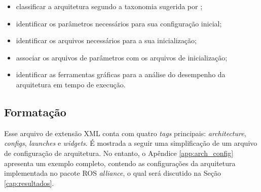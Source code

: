         \begin{itemize}
            \item classificar a arquitetura segundo a taxonomia sugerida por ;
            
            \item identificar os parâmetros necessários para sua configuração inicial;
            
            \item identificar os arquivos necessários para a sua inicialização;
            
            \item associar os arquivos de parâmetros com os arquivos de inicialização;
            
            \item identificar as ferramentas gráficas para a análise do desempenho da arquitetura em tempo de execução.
        \end{itemize}
        
        \subsection{Formatação} \label{subsec:arch_config_fmt}
            Esse arquivo de extensão XML conta com quatro \textit{tags} principais: \textit{architecture}, \textit{configs}, \textit{launches} e \textit{widgets}. É mostrada a seguir uma simplificação de um arquivo de configuração de arquitetura. No entanto, o Apêndice \ref{app:arch_config} apresenta um exemplo completo, contendo as configurações da arquitetura implementada no pacote ROS \textit{alliance}, o qual será discutido na Seção \ref{cap:resultados}.
            
